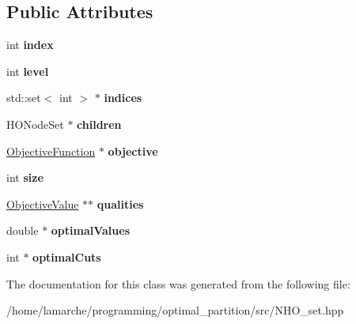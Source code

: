 \subsection*{Public Attributes}
\begin{DoxyCompactItemize}
\item 
\hypertarget{classNHONode_a013a329d2040bad27a73441713cc6889}{int {\bfseries index}}\label{classNHONode_a013a329d2040bad27a73441713cc6889}

\item 
\hypertarget{classNHONode_ac8986878a95cff24e48213bb5797f16b}{int {\bfseries level}}\label{classNHONode_ac8986878a95cff24e48213bb5797f16b}

\item 
\hypertarget{classNHONode_a0aa84b08ee2451dce8e3cdf4326eb8f4}{std\-::set$<$ int $>$ $\ast$ {\bfseries indices}}\label{classNHONode_a0aa84b08ee2451dce8e3cdf4326eb8f4}

\item 
\hypertarget{classNHONode_a0ba248697389f672625383d1f3ad1b1c}{H\-O\-Node\-Set $\ast$ {\bfseries children}}\label{classNHONode_a0ba248697389f672625383d1f3ad1b1c}

\item 
\hypertarget{classNHONode_acab2ed08c3d77ece7104c30359d2aa58}{\hyperlink{classObjectiveFunction}{Objective\-Function} $\ast$ {\bfseries objective}}\label{classNHONode_acab2ed08c3d77ece7104c30359d2aa58}

\item 
\hypertarget{classNHONode_a0df5a9dd324f86be0164a54fe80cf5b0}{int {\bfseries size}}\label{classNHONode_a0df5a9dd324f86be0164a54fe80cf5b0}

\item 
\hypertarget{classNHONode_a40c3a14d897eff575063ba8e99449279}{\hyperlink{classObjectiveValue}{Objective\-Value} $\ast$$\ast$ {\bfseries qualities}}\label{classNHONode_a40c3a14d897eff575063ba8e99449279}

\item 
\hypertarget{classNHONode_a4e5234e92269a9bdb391c0e4d2f7f83e}{double $\ast$ {\bfseries optimal\-Values}}\label{classNHONode_a4e5234e92269a9bdb391c0e4d2f7f83e}

\item 
\hypertarget{classNHONode_ab98175d354eac8ecfe571ec7ae6919d4}{int $\ast$ {\bfseries optimal\-Cuts}}\label{classNHONode_ab98175d354eac8ecfe571ec7ae6919d4}

\end{DoxyCompactItemize}


The documentation for this class was generated from the following file\-:\begin{DoxyCompactItemize}
\item 
/home/lamarche/programming/optimal\-\_\-partition/src/N\-H\-O\-\_\-set.\-hpp\end{DoxyCompactItemize}
